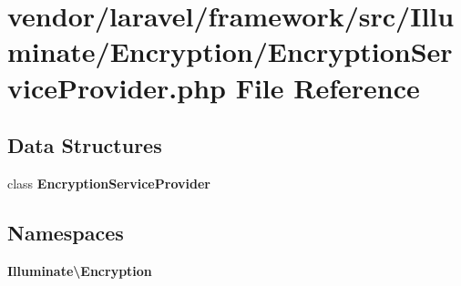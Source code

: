 \section{vendor/laravel/framework/src/\+Illuminate/\+Encryption/\+Encryption\+Service\+Provider.php File Reference}
\label{_encryption_service_provider_8php}
\subsection*{Data Structures}
\begin{DoxyCompactItemize}
\item 
class {\bf Encryption\+Service\+Provider}
\end{DoxyCompactItemize}
\subsection*{Namespaces}
\begin{DoxyCompactItemize}
\item 
 {\bf Illuminate\textbackslash{}\+Encryption}
\end{DoxyCompactItemize}
